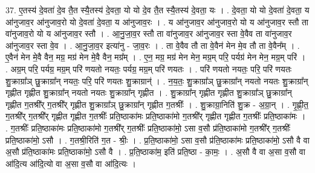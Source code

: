 \documentclass[17pt]{extarticle}
\begin{document}
37. ए॒तस्य॑ दे॒वता॑ दे॒व तै॒त स्यै॒तस्य॑ दे॒वता॒ यो यो दे॒व तै॒त स्यै॒तस्य॑ दे॒वता॒ यः । . दे॒वता॒ यो यो दे॒वता॑ दे॒वता॒ य आ॑नुजाव॒र आ॑नुजाव॒रो यो दे॒वता॑ दे॒वता॒ य आ॑नुजाव॒रः । . य आ॑नुजाव॒र आ॑नुजाव॒रो यो य आ॑नुजाव॒र स्तौ ता वा॑नुजाव॒रो यो य आ॑नुजाव॒र स्तौ । . आ॒नु॒जा॒व॒र स्तौ ता वा॑नुजाव॒र आ॑नुजाव॒र स्ता वे॒वैव ता वा॑नुजाव॒र आ॑नुजाव॒र स्ता वे॒व । . आ॒नु॒जा॒व॒र इत्या॑नु - जा॒व॒रः । . ता वे॒वैव तौ ता वे॒वैन॑ मेन मे॒व तौ ता वे॒वैन᳚म् । . ए॒वैन॑ मेन मे॒वै वैन॒ मग्र॒ मग्र॑ मेन मे॒वै वैन॒ मग्र᳚म् । . ए॒न॒ मग्र॒ मग्र॑ मेन मेन॒ मग्र॒म् परि॒ पर्यग्र॑ मेन मेन॒ मग्र॒म् परि॑ । . अग्र॒म् परि॒ पर्यग्र॒ मग्र॒म् परि॑ णयतो नयतः॒ पर्यग्र॒ मग्र॒म् परि॑ णयतः । . परि॑ णयतो नयतः॒ परि॒ परि॑ णयतः शु॒क्राग्रा᳚ञ् छु॒क्राग्रा᳚न् नयतः॒ परि॒ परि॑ णयतः शु॒क्राग्रान्॑ । . न॒य॒तः॒ शु॒क्राग्रा᳚ञ् छु॒क्राग्रा᳚न् नयतो नयतः शु॒क्राग्रा᳚न् गृह्णीत गृह्णीत शु॒क्राग्रा᳚न् नयतो नयतः शु॒क्राग्रा᳚न् गृह्णीत । . शु॒क्राग्रा᳚न् गृह्णीत गृह्णीत शु॒क्राग्रा᳚ञ् छु॒क्राग्रा᳚न् गृह्णीत ग॒तश्री᳚र् ग॒तश्री᳚र् गृह्णीत शु॒क्राग्रा᳚ञ् छु॒क्राग्रा᳚न् गृह्णीत ग॒तश्रीः᳚ । . शु॒क्राग्रा॒निति॑ शु॒क्र - अ॒ग्रा॒न् । . गृ॒ह्णी॒त॒ ग॒तश्री᳚र् ग॒तश्री᳚र् गृह्णीत गृह्णीत ग॒तश्रीः᳚ प्रति॒ष्ठाका॑मः प्रति॒ष्ठाका॑मो ग॒तश्री᳚र् गृह्णीत गृह्णीत ग॒तश्रीः᳚ प्रति॒ष्ठाका॑मः । . ग॒तश्रीः᳚ प्रति॒ष्ठाका॑मः प्रति॒ष्ठाका॑मो ग॒तश्री᳚र् ग॒तश्रीः᳚ प्रति॒ष्ठाका॑मो॒ ऽसा व॒सौ प्र॑ति॒ष्ठाका॑मो ग॒तश्री᳚र् ग॒तश्रीः᳚ प्रति॒ष्ठाका॑मो॒ ऽसौ । . ग॒तश्री॒रिति॑ ग॒त - श्रीः॒ । . प्र॒ति॒ष्ठाका॑मो॒ ऽसा व॒सौ प्र॑ति॒ष्ठाका॑मः प्रति॒ष्ठाका॑मो॒ ऽसौ वै वा अ॒सौ प्र॑ति॒ष्ठाका॑मः प्रति॒ष्ठाका॑मो॒ ऽसौ वै । . प्र॒ति॒ष्ठाका॑म॒ इति॑ प्रति॒ष्ठा - का॒मः॒ । . अ॒सौ वै वा अ॒सा व॒सौ वा आ॑दि॒त्य आ॑दि॒त्यो वा अ॒सा व॒सौ वा आ॑दि॒त्यः । \newline
\end{document}
